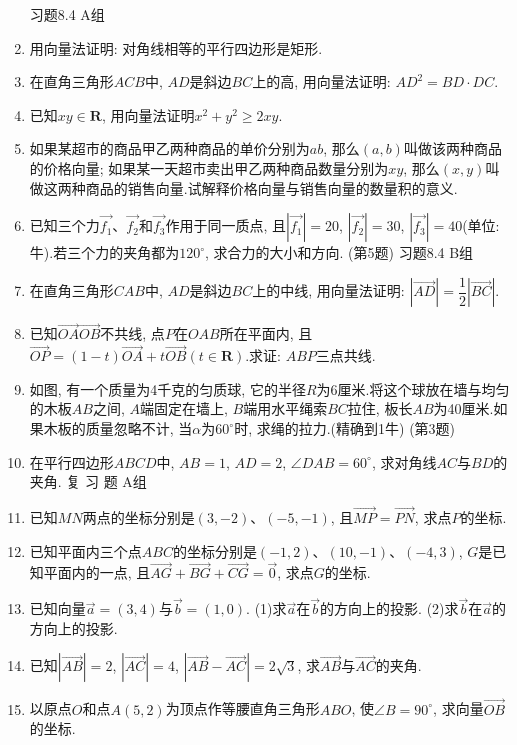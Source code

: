 \documentclass[10pt,a4paper]{article}
\begin{document}
\begin{enumerate}[1.]
习题8.4  A组
\item 用向量法证明: 对角线相等的平行四边形是矩形.
\item 在直角三角形$ACB$中, $AD$是斜边$BC$上的高, 用向量法证明: $AD^2=BD\cdot DC$.
\item 已知$xy\in \mathbf{R}$, 用向量法证明$x^2+y^2\ge 2xy$.
\item 如果某超市的商品甲乙两种商品的单价分别为$ab$, 那么$(a,b)$叫做该两种商品的价格向量; 如果某一天超市卖出甲乙两种商品数量分别为$xy$, 那么$(x,y)$叫做这两种商品的销售向量.试解释价格向量与销售向量的数量积的意义.
\item 已知三个力$\overrightarrow {f_1}$、$\overrightarrow {f_2}$和$\overrightarrow {f_3}$作用于同一质点, 且$|\overrightarrow {f_1}|=20$, $|\overrightarrow {f_2}|=30$, $|\overrightarrow {f_3}|=40$(单位: 牛).若三个力的夹角都为$120^{\circ }$, 求合力的大小和方向.
(第5题)
习题8.4  B组
\item 在直角三角形$CAB$中, $AD$是斜边$BC$上的中线, 用向量法证明: $|\overrightarrow {AD}|=\dfrac 12|\overrightarrow {BC}|$.
\item 已知$\overrightarrow {OA}\overrightarrow {OB}$不共线, 点$P$在$OAB$所在平面内, 且$\overrightarrow {OP}=(1-t)\overrightarrow {OA}+t\overrightarrow {OB}(t\in \mathbf{R})$.求证: $ABP$三点共线.
\item 如图, 有一个质量为4千克的匀质球, 它的半径$R$为6厘米.将这个球放在墙与均匀的木板$AB$之间, $A$端固定在墙上, $B$端用水平绳索$BC$拉住, 板长$AB$为40厘米.如果木板的质量忽略不计, 当$\alpha$为$60^{\circ }$时, 求绳的拉力.(精确到1牛)
(第3题)
\item 在平行四边形$ABCD$中, $AB=1$, $AD=2$, $\angle DAB=60^{\circ }$, 求对角线$AC$与$BD$的夹角.
复 习 题
A组
\item 已知$MN$两点的坐标分别是$(3,-2)$、$(-5,-1)$, 且$\overrightarrow {MP}=\overrightarrow {PN}$, 求点$P$的坐标.
\item 已知平面内三个点$ABC$的坐标分别是$(-1,2)$、$(10,-1)$、$(-4,3)$, $G$是已知平面内的一点, 且$\overrightarrow {AG}+\overrightarrow {BG}+\overrightarrow {CG}=\overrightarrow 0$, 求点$G$的坐标.
\item 已知向量$\overrightarrow a=(3,4)$与$\overrightarrow b=(1,0)$.
(1)求$\overrightarrow a$在$\overrightarrow b$的方向上的投影.
(2)求$\overrightarrow b$在$\overrightarrow a$的方向上的投影.
\item 已知$|\overrightarrow {AB}|=2$, $|\overrightarrow {AC}|=4$, $|\overrightarrow {AB}-\overrightarrow {AC}|=2\sqrt 3$, 求$\overrightarrow {AB}$与$\overrightarrow {AC}$的夹角.
\item 以原点$O$和点$A(5,2)$为顶点作等腰直角三角形$ABO$, 使$\angle B=90^{\circ }$, 求向量$\overrightarrow {OB}$的坐标.

\end{enumerate}
\end{document}
